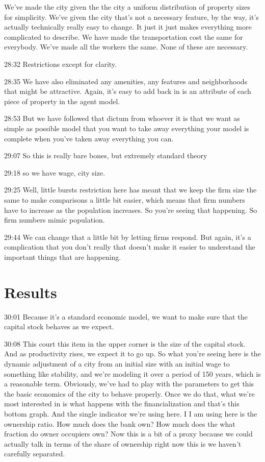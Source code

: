 We've made the city given the the city a uniform distribution of property sizes for simplicity. We've given the city that's not a necessary feature, by the way, it's actually technically really easy to change. It just it just makes everything more complicated to describe. We have made the transportation cost the same for everybody. We've made all the workers the same. None of these are necessary.

28:32
Restrictions except for clarity.

28:35
We have also eliminated any amenities, any features and neighborhoods that might be attractive. Again, it's easy to add back in is an attribute of each piece of property in the agent model.

28:53
But we have followed that dictum from whoever it is that we want as simple as possible model that you want to take away everything your model is complete when you've taken away everything you can.

29:07
So this is really bare bones, but extremely standard theory

29:18
so we have wage, city size.

29:25
Well, little bursts restriction here has meant that we keep the firm size the same to make comparisons a little bit easier, which means that firm numbers have to increase as the population increases. So you're seeing that happening. So firm numbers mimic population.

29:44
We can change that a little bit by letting firms respond. But again, it's a complication that you don't really that doesn't make it easier to understand the important things that are happening.


\section{Results}

30:01
Because it's a standard economic model, we want to make sure that the capital stock behaves as we expect.

30:08
This court this item in the upper corner is the size of the capital stock. And as productivity rises, we expect it to go up. So what you're seeing here is the dynamic adjustment of a city from an initial size with an initial wage to something like stability, and we're modeling it over a period of 150 years, which is a reasonable term. Obviously, we've had to play with the parameters to get this the basic economics of the city to behave properly. Once we do that, what we're most interested in is what happens with the financialization and that's this bottom graph. And the single indicator we're using here. I I am using here is the ownership ratio. How much does the bank own? How much does the what fraction do owner occupiers own? Now this is a bit of a proxy because we could actually talk in terms of the share of ownership right now this is we haven't carefully separated.


